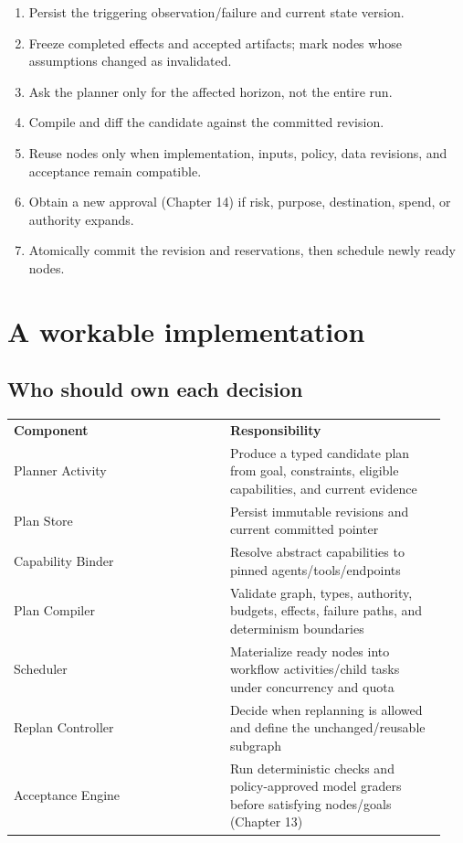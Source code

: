 \begin{enumerate}

\item Persist the triggering observation/failure and current state version.

\item Freeze completed effects and accepted artifacts; mark nodes whose assumptions changed as invalidated.

\item Ask the planner only for the affected horizon, not the entire run.

\item Compile and diff the candidate against the committed revision.

\item Reuse nodes only when implementation, inputs, policy, data revisions, and acceptance remain compatible.

\item Obtain a new approval (Chapter 14) if risk, purpose, destination, spend, or authority expands.

\item Atomically commit the revision and reservations, then schedule newly ready nodes.

\end{enumerate}

\section{A workable implementation}

\subsection{Who should own each decision}

\BookTableStart
\small
\begin{tabular}{@{}Y{0.4700\linewidth}Y{0.4700\linewidth}@{}}
\color{white}\bfseries \textbf{Component} & \color{white}\bfseries \textbf{Responsibility} \\
Planner Activity & Produce a typed candidate plan from goal, constraints, eligible capabilities, and current evidence \\
Plan Store & Persist immutable revisions and current committed pointer \\
Capability Binder & Resolve abstract capabilities to pinned agents/tools/endpoints \\
Plan Compiler & Validate graph, types, authority, budgets, effects, failure paths, and determinism boundaries \\
Scheduler & Materialize ready nodes into workflow activities/child tasks under concurrency and quota \\
Replan Controller & Decide when replanning is allowed and define the unchanged/reusable subgraph \\
Acceptance Engine & Run deterministic checks and policy-approved model graders before satisfying nodes/goals (Chapter 13) \\
\end{tabular}
\BookTableEnd

